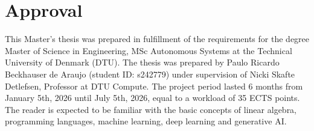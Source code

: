 \section*{Approval}
This Master's thesis was prepared in fulfillment of the requirements for the degree Master of
Science in Engineering, MSc Autonomous Systems at the Technical University of
Denmark (DTU). The thesis was prepared by Paulo Ricardo Beckhauser de Araujo
(student ID: s242779) under supervision of Nicki Skafte Detlefsen, Professor
at DTU Compute. The project period lasted 6 months from January 5th, 2026
until July 5th, 2026, equal to a workload of 35 ECTS points. \\

The reader is expected to be familiar with the basic concepts of linear
algebra, programming languages, machine learning, deep learning and generative
AI.

\vfill

\begin{center}
\namesigdate{\thesisauthor~-~\studentnumber}
\end{center}

\vfill
